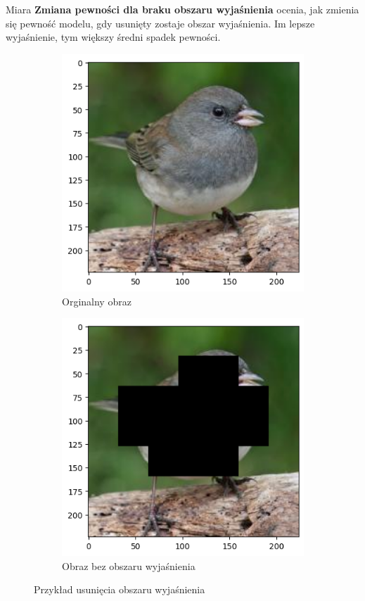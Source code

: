 Miara \textbf{Zmiana pewności dla braku obszaru wyjaśnienia} ocenia, jak zmienia się pewność modelu, gdy usunięty zostaje obszar wyjaśnienia.
Im lepsze wyjaśnienie, tym większy średni spadek pewności.

\begin{figure}
	\begin{subfigure}[b]{0.45\textwidth}
		\centering\includegraphics[width=.9\textwidth]{img/parameters/quality/base}
		\caption{Orginalny obraz}  \label{rys:parameters_lime_numsamples_1000}
	\end{subfigure}
	\begin{subfigure}[b]{0.45\textwidth}
		\centering\includegraphics[width=.9\textwidth]{img/parameters/quality/wo_mask}
		\caption{Obraz bez obszaru wyjaśnienia}  \label{rys:parameters_lime_numsamples_1000}
	\end{subfigure}
	\caption{Przykład usunięcia obszaru wyjaśnienia}
\end{figure}

